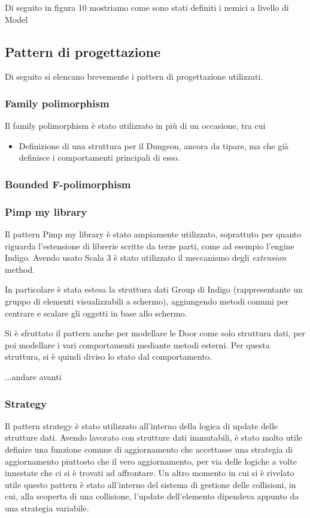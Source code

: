 Di seguito in figura 10 mostriamo come sono stati definiti i nemici a livello di Model

\subsection{Pattern di progettazione}
Di seguito si elencano brevemente i pattern di progettazione utilizzati. 
\subsubsection{Family polimorphism}
Il family polimorphism è stato utilizzato in più di un occasione, tra cui
\begin{itemize}
    \item Definizione di una struttura per il Dungeon, ancora da tipare, ma che già definisce i comportamenti principali di esso.
\end{itemize}
\subsubsection{Bounded F-polimorphism}
\subsubsection{Pimp my library}
Il pattern Pimp my library è stato ampiamente utilizzato, soprattuto per quanto riguarda l'estensione di librerie scritte da terze parti, come ad esempio l'engine Indigo. 
Avendo usato Scala 3 è stato utilizzato il meccanismo degli \textit{extension} method.

In particolare è stata estesa la struttura dati Group di Indigo (rappresentante un gruppo di elementi visualizzabili a schermo), aggiungendo metodi comuni per centrare e scalare gli oggetti in base allo schermo.

Si è sfruttato il pattern anche per modellare le Door come solo struttura dati, per poi modellare i vari comportamenti mediante metodi esterni. Per questa struttura, si è quindi diviso lo stato dal comportamento. 

...andare avanti

\subsubsection{Strategy}
Il pattern strategy è stato utilizzato all'interno della logica di update delle strutture dati. Avendo lavorato con strutture dati immutabili, è stato molto utile definire una funzione comune di aggiornamento che accettasse una strategia di aggiornamento piuttosto che il vero aggiornamento, per via delle logiche a volte innestate che ci si è trovati ad affrontare. 
Un altro momento in cui si è rivelato utile questo pattern è stato all'interno del sistema di gestione delle collisioni, in cui, alla scoperta di una collisione, l'update dell'elemento dipendeva appunto da una strategia variabile. 
